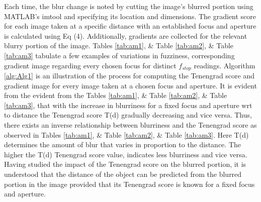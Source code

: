 \documentclass[sn-mathphys]{sn-jnl}%
\theoremstyle{thmstyleone}%
\theoremstyle{thmstyletwo}%
\theoremstyle{thmstylethree}%
\begin{document}
Each time, the blur change is noted by cutting the image's blurred portion using MATLAB's imtool and specifying its location and dimensions. The gradient score for each image taken at a specific distance with an established focus and aperture is calculated using Eq (4). Additionally, gradients are collected for the relevant blurry portion of the image.  Tables \ref{tab:am1}, \& Table \ref{tab:am2}, \& Table \ref{tab:am3} tabulate a few examples of variations in fuzziness, corresponding gradient image regarding every chosen focus for distinct $f_{stop}$ readings. Algorithm \ref{alg:Alg1} is an illustration of the process for computing the Tenengrad score and gradient image for every image taken at a chosen focus and aperture. It is evident from the evident from the  Tables \ref{tab:am1}, \& Table \ref{tab:am2}, \& Table \ref{tab:am3}, that with the increase in blurriness for a fixed focus and aperture wrt to distance the Tenengrad score T(d) gradually decreasing and vice versa. Thus, there exists an inverse relationship between blurriness and the Tenengrad score as observed in  Tables \ref{tab:am1}, \& Table \ref{tab:am2}, \& Table \ref{tab:am3}. Here T(d) determines the amount of blur that varies in proportion to the distance. The higher the T(d) Tenengrad score value, indicates less blurriness and vice versa. Having studied the impact of the Tenengrad score on the blurred portion, it is understood that the distance of the object can be predicted from the blurred portion in the image provided that its Tenengrad score is known for a fixed focus and aperture. 
\end{document}
